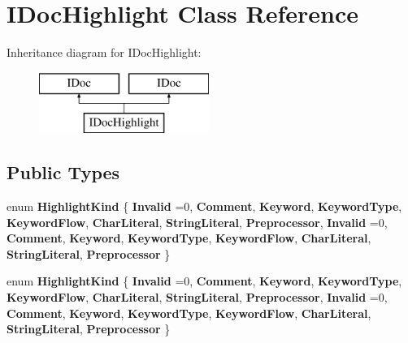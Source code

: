 \hypertarget{class_i_doc_highlight}{}\section{I\+Doc\+Highlight Class Reference}
\label{class_i_doc_highlight}
Inheritance diagram for I\+Doc\+Highlight\+:\begin{figure}[H]
\begin{center}
\leavevmode
\includegraphics[height=2.000000cm]{class_i_doc_highlight}
\end{center}
\end{figure}
\subsection*{Public Types}
\begin{DoxyCompactItemize}
\item 
\mbox{\label{class_i_doc_highlight_a30689ad7839e8d7f1a51ae1eacd81683}} 
enum {\bfseries Highlight\+Kind} \{ \newline
{\bfseries Invalid} =0, 
{\bfseries Comment}, 
{\bfseries Keyword}, 
{\bfseries Keyword\+Type}, 
\newline
{\bfseries Keyword\+Flow}, 
{\bfseries Char\+Literal}, 
{\bfseries String\+Literal}, 
{\bfseries Preprocessor}, 
\newline
{\bfseries Invalid} =0, 
{\bfseries Comment}, 
{\bfseries Keyword}, 
{\bfseries Keyword\+Type}, 
\newline
{\bfseries Keyword\+Flow}, 
{\bfseries Char\+Literal}, 
{\bfseries String\+Literal}, 
{\bfseries Preprocessor}
 \}
\item 
\mbox{\label{class_i_doc_highlight_a30689ad7839e8d7f1a51ae1eacd81683}} 
enum {\bfseries Highlight\+Kind} \{ \newline
{\bfseries Invalid} =0, 
{\bfseries Comment}, 
{\bfseries Keyword}, 
{\bfseries Keyword\+Type}, 
\newline
{\bfseries Keyword\+Flow}, 
{\bfseries Char\+Literal}, 
{\bfseries String\+Literal}, 
{\bfseries Preprocessor}, 
\newline
{\bfseries Invalid} =0, 
{\bfseries Comment}, 
{\bfseries Keyword}, 
{\bfseries Keyword\+Type}, 
\newline
{\bfseries Keyword\+Flow}, 
{\bfseries Char\+Literal}, 
{\bfseries String\+Literal}, 
{\bfseries Preprocessor}
 \}
\end{DoxyCompactItemize}

